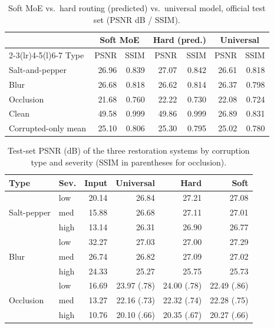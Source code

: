 \documentclass[conference]{IEEEtran}
\begin{document}
\begin{table}[t]
\caption{Soft MoE vs.\ hard routing (predicted) vs.\ universal model, official test set (PSNR dB / SSIM).}
\label{tab:t3type}
\centering\footnotesize
\setlength{\tabcolsep}{3.5pt}
\begin{tabular}{@{}lrrrrrr@{}}
\toprule
 & \multicolumn{2}{c}{Soft MoE} & \multicolumn{2}{c}{Hard (pred.)} & \multicolumn{2}{c}{Universal}\\
\cmidrule(lr){2-3}\cmidrule(lr){4-5}\cmidrule(l){6-7}
Type & PSNR & SSIM & PSNR & SSIM & PSNR & SSIM\\
\midrule
Salt-and-pepper & 26.96 & 0.839 & 27.07 & 0.842 & 26.61 & 0.818\\
Blur & 26.68 & 0.818 & 26.62 & 0.814 & 26.37 & 0.798\\
Occlusion & 21.68 & 0.760 & 22.22 & 0.730 & 22.08 & 0.724\\
Clean & 49.58 & 0.999 & 49.86 & 0.999 & 26.89 & 0.831\\
\midrule
Corrupted-only mean & 25.10 & 0.806 & 25.30 & 0.795 & 25.02 & 0.780\\
\bottomrule
\end{tabular}
\end{table}

\begin{table}[t]
\caption{Test-set PSNR (dB) of the three restoration systems by corruption type and severity (SSIM in parentheses for occlusion).}
\label{tab:sev3}
\centering\footnotesize
\setlength{\tabcolsep}{4pt}
\begin{tabular}{@{}llrrrr@{}}
\toprule
Type & Sev. & Input & Universal & Hard & Soft\\
\midrule
\multirow{3}{*}{Salt-pepper} & low & 20.14 & 26.84 & 27.21 & 27.08\\
 & med & 15.88 & 26.68 & 27.11 & 27.01\\
 & high & 13.14 & 26.31 & 26.90 & 26.77\\
\midrule
\multirow{3}{*}{Blur} & low & 32.27 & 27.03 & 27.00 & 27.29\\
 & med & 26.74 & 26.82 & 27.09 & 27.02\\
 & high & 24.33 & 25.27 & 25.75 & 25.73\\
\midrule
\multirow{3}{*}{Occlusion} & low & 16.69 & 23.97 (.78) & 24.00 (.78) & 22.49 (.86)\\
 & med & 13.27 & 22.16 (.73) & 22.32 (.74) & 22.28 (.75)\\
 & high & 10.76 & 20.10 (.66) & 20.35 (.67) & 20.27 (.66)\\
\bottomrule
\end{tabular}
\end{table}
\end{document}

